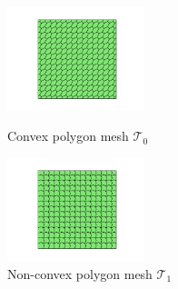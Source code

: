 \documentclass[notheorems,serif]{beamer}
\begin{document}
\begin{CJK}{UTF8}{gkai}
\begin{frame}
\begin{figure}[htbp]
\centering
\begin{minipage}[t]{0.49\linewidth}
\centering
\includegraphics[width=4cm]{../figures/convex.pdf}
\caption{Convex polygon mesh $\mathcal T_0$}
\end{minipage}%
\begin{minipage}[t]{0.49\linewidth}
\centering
\includegraphics[width=4cm]{../figures/nonconvex.pdf}
\caption{Non-convex polygon mesh $\mathcal T_1$}
\end{minipage}%
\centering
\end{figure}
\end{frame}


\end{CJK}
\end{document}
